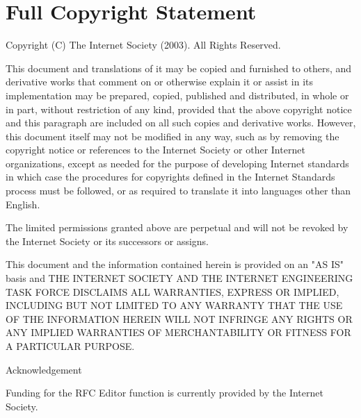 \documentclass{article}
\begin{document}
\section*{Full Copyright Statement}

Copyright (C) The Internet Society (2003).  All Rights Reserved.

This document and translations of it may be copied and furnished to others, and derivative works that comment on or otherwise explain it or assist in its implementation may be prepared, copied, published and distributed, in whole or in part, without restriction of any kind, provided that the above copyright notice and this paragraph are included on all such copies and derivative works.  However, this document itself may not be modified in any way, such as by removing the copyright notice or references to the Internet Society or other Internet organizations, except as needed for the purpose of developing Internet standards in which case the procedures for copyrights defined in the Internet Standards process must be followed, or as required to translate it into languages other than English.

The limited permissions granted above are perpetual and will not be revoked by the Internet Society or its successors or assigns.

This document and the information contained herein is provided on an "AS IS" basis and THE INTERNET SOCIETY AND THE INTERNET ENGINEERING TASK FORCE DISCLAIMS ALL WARRANTIES, EXPRESS OR IMPLIED, INCLUDING BUT NOT LIMITED TO ANY WARRANTY THAT THE USE OF THE INFORMATION HEREIN WILL NOT INFRINGE ANY RIGHTS OR ANY IMPLIED WARRANTIES OF MERCHANTABILITY OR FITNESS FOR A PARTICULAR PURPOSE.

Acknowledgement

Funding for the RFC Editor function is currently provided by the Internet Society.
\end{document}
